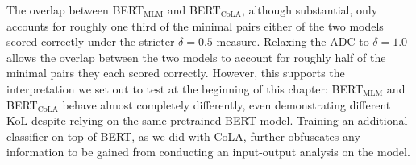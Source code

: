 The overlap between BERT$_{\mathrm{MLM}}$ and BERT$_{\mathrm{CoLA}}$, although substantial, only accounts for roughly one third of the minimal pairs either of the two models scored correctly under the stricter $\delta=0.5$ measure.  Relaxing the ADC to $\delta=1.0$ allows the overlap between the two models to account for roughly half of the minimal pairs they each scored correctly.  However, this supports the interpretation we set out to test at the beginning of this chapter: BERT$_{\mathrm{MLM}}$ and BERT$_{\mathrm{CoLA}}$ behave almost completely differently, even demonstrating different KoL despite relying on the same pretrained BERT model.  Training an additional classifier on top of BERT, as we did with CoLA, further obfuscates any information to be gained from conducting an input-output analysis on the model.










